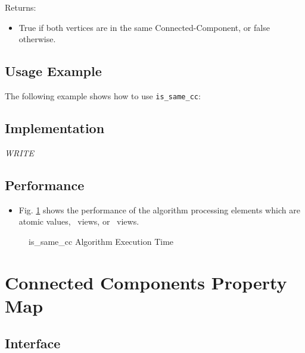 Returns:
\begin{itemize}
\item
True if both vertices are in the same Connected-Component, or false otherwise. 
\end{itemize}

\subsection{Usage Example} \label{sec-is-same-cc-alg-use}

The following example shows how to use 
\texttt{is\_same\_cc}:


\subsection{Implementation} \label{sec-is-same-cc-alg-impl}

\textit{WRITE}

\subsection{Performance} \label{sec-is-same-cc-alg-perf}

\begin{itemize}
\item
Fig. \ref{fig:is-same-cc-alg-exec-exper}
shows the performance of the algorithm processing
elements which are atomic values, \stl\ views, or \stapl\ views.
\end{itemize}

\begin{figure}[p]
\caption{is\_same\_cc Algorithm Execution Time}
\label{fig:is-same-cc-alg-exec-exper}
\end{figure}


\section{ Connected Components Property Map}
\label{sec-p-stats-cc-alg}

\subsection{Interface} \label{sec-p-stats-cc-alg-inter}

